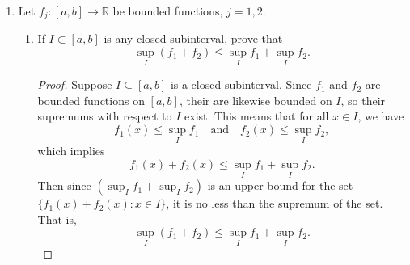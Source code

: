 \documentclass[12pt]{article}
\newcommand{\N}{\mathbb{N}}
\newcommand{\R}{\mathbb{R}}
\newcommand{\ds}{\displaystyle}
\newcommand{\seq}[1]{\left\{#1\right\}_{n=1}^\infty}
\newcommand{\isp}[1]{\quad\text{#1}\quad}
\begin{document}
\begin{enumerate}
\begin{enumerate}
\begin{proof}
    Suppose $\alpha\in\R$ is such that
    \[|f(x)-f(y)|\le \alpha ,\isp{and} x,y\in I.\]
    We now construct two sequences $\seq{x_n}$ and $\seq{y_n}$ in $I$ such that 
    \[f(x_n) \in \left[M-\frac1n, M\right]\cap f(I) \isp{and} f(y_n)\in \left[m,m+\frac1n\right]\cap f(I).\]
    We can define these sequences in this way as $M$ and $m$ are given as the supremum and infimum of $f(I)$, respectively, so we can find points in $I$ with their image under $f$ arbitrarily close to either. This construction gives us $f(x_n)\to M$ and $f(y_n)\to m$ as $n\to\infty$. Then by assumption, we have
    \[|f(x_n)-f(y_n)| \leq \alpha,\]
    for all $n\in\N$. So now letting $n\to\infty$, we find
    \[|M-m| \leq \alpha.\]
    And since $m\leq M$, we in fact have $M-n\leq \alpha$.
    
\end{proof}

\item
Prove that if $S_j$, $j=1,2$, are two Riemann sums for $f$ relative to some partition $P$
of $[a,b]$, then
\[|S_1-S_2|\le U(P,f)-L(P,f).\]

\begin{proof}
    Suppose $S_1,S_2$ are Riemann sums for $f$ associated with the partition $P$ of $[a,b]$. Then for each we have
    \[L(P,f) \leq S_1 \leq U(P,f) \isp{and} L(P,f) \leq S_2 \leq U(P,f).\]
    Multiplying the right inequality by $-1$ and adding both together, we find
    \[L(P,f)-U(P,f) \leq S_1-S_2 \leq U(P,f)-L(P,f).\]
    This implies $|S_1-S_2|\leq U(P,f)-L(P,f)$.
    
\end{proof}

\end{enumerate}

\newpage
\item
Let $f_j:[a,b]\to\R$ be bounded functions, $j=1,2$.\
\begin{enumerate}

\item
If $I\subset[a,b]$ is any closed subinterval, prove that
\[\sup_I(f_1+f_2)\le \sup_If_1+\sup_I f_2.\]

\begin{proof}
    Suppose $I\subseteq[a,b]$ is a closed subinterval. Since $f_1$ and $f_2$ are bounded functions on $[a,b]$, their are likewise bounded on $I$, so their supremums with respect to $I$ exist. This means that for all $x\in I$, we have
    \[f_1(x)\leq \sup_If_1 \isp{and} f_2(x)\leq \sup_If_2,\]
    which implies
    \[f_1(x)+f_2(x)\leq \sup_If_1 + \sup_If_2.\]
    Then since $\ds(\sup_If_1 + \sup_If_2)$ is an upper bound for the set $\{f_1(x)+f_2(x):x\in I\}$, it is no less than the supremum of the set. That is,
    \[\sup_I(f_1+f_2)\le \sup_If_1+\sup_I f_2.\]
    

\end{proof}
\end{enumerate}
\end{enumerate}
\end{document}
